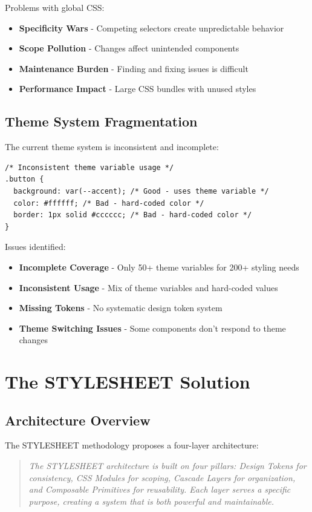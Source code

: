 \documentclass[11pt]{article}
\begin{document}
Problems with global CSS:
\begin{itemize}
\item \textbf{Specificity Wars} - Competing selectors create unpredictable behavior
\item \textbf{Scope Pollution} - Changes affect unintended components
\item \textbf{Maintenance Burden} - Finding and fixing issues is difficult
\item \textbf{Performance Impact} - Large CSS bundles with unused styles
\end{itemize}

\subsection{Theme System Fragmentation}

The current theme system is inconsistent and incomplete:

\begin{lstlisting}[style=css]
/* Inconsistent theme variable usage */
.button {
  background: var(--accent); /* Good - uses theme variable */
  color: #ffffff; /* Bad - hard-coded color */
  border: 1px solid #cccccc; /* Bad - hard-coded color */
}
\end{lstlisting}

Issues identified:
\begin{itemize}
\item \textbf{Incomplete Coverage} - Only 50+ theme variables for 200+ styling needs
\item \textbf{Inconsistent Usage} - Mix of theme variables and hard-coded values
\item \textbf{Missing Tokens} - No systematic design token system
\item \textbf{Theme Switching Issues} - Some components don't respond to theme changes
\end{itemize}

\section{The STYLESHEET Solution}

\subsection{Architecture Overview}

The STYLESHEET methodology proposes a four-layer architecture:

\begin{quote}
\emph{The STYLESHEET architecture is built on four pillars: Design Tokens for consistency, CSS Modules for scoping, Cascade Layers for organization, and Composable Primitives for reusability. Each layer serves a specific purpose, creating a system that is both powerful and maintainable.}
\end{quote}
\end{document}
